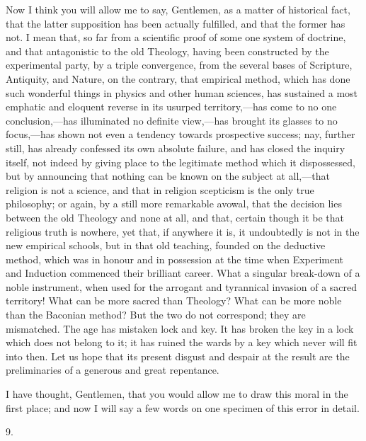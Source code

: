 Now I think you will allow me to say, Gentlemen, as a matter of
historical fact, that the latter supposition has been actually
fulfilled, and that the former has not. I mean that, so far from a
scientific proof of some one system of doctrine, and that antagonistic
to the old Theology, having been constructed by the experimental
party, by a triple convergence, from the several bases of Scripture,
Antiquity, and Nature, on the contrary, that empirical method,
which has done such wonderful things in physics and other human
sciences, has sustained a most emphatic and eloquent reverse in its
usurped territory,—has come to no one conclusion,—has illuminated
no definite view,—has brought its glasses to no focus,—has shown
not even a tendency towards prospective success; nay, further still,
has already confessed its own absolute failure, and has closed the
inquiry itself, not indeed by giving place to the legitimate method
which it dispossessed, but by announcing that nothing can be known on
the subject at all,—that religion is not a science, and that in
religion scepticism is the only true philosophy; or again, by a still
more remarkable avowal, that the decision lies between the old
Theology and none at all, and that, certain though it be that
religious truth is nowhere, yet that, if anywhere it is, it
undoubtedly is not in the new empirical schools, but in that old
teaching, founded on the deductive method, which was in honour and in
possession at the time when Experiment and Induction commenced their
brilliant career. What a singular break-down of a noble instrument,
when used for the arrogant and tyrannical invasion of a sacred
territory! What can be more sacred than Theology? What can be more
noble than the Baconian method? But the two do not correspond; they
are mismatched. The age has mistaken lock and key. It has broken the
key in a lock which does not belong to it; it has ruined the wards by
a key which never will fit into then. Let us hope that its present
disgust and despair at the result are the preliminaries of a generous
and great repentance.

I have thought, Gentlemen, that you would allow me to draw this
moral in the first place; and now I will say a few words on one
specimen of this error in detail.

9.

